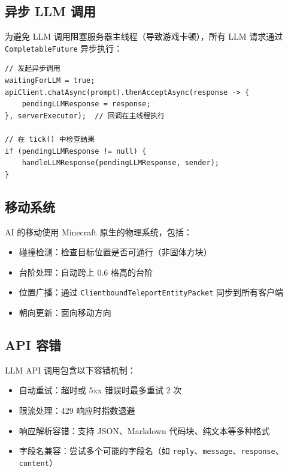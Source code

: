 \documentclass[12pt,a4paper]{article}
\begin{document}
\subsection{异步 LLM 调用}

为避免 LLM 调用阻塞服务器主线程（导致游戏卡顿），所有 LLM 请求通过 \texttt{CompletableFuture} 异步执行：

\begin{lstlisting}[caption={异步调用模式},label={lst:async}]
// 发起异步调用
waitingForLLM = true;
apiClient.chatAsync(prompt).thenAcceptAsync(response -> {
    pendingLLMResponse = response;
}, serverExecutor);  // 回调在主线程执行

// 在 tick() 中检查结果
if (pendingLLMResponse != null) {
    handleLLMResponse(pendingLLMResponse, sender);
}
\end{lstlisting}

\subsection{移动系统}

AI 的移动使用 Minecraft 原生的物理系统，包括：

\begin{itemize}
    \item 碰撞检测：检查目标位置是否可通行（非固体方块）
    \item 台阶处理：自动跨上 0.6 格高的台阶
    \item 位置广播：通过 \texttt{ClientboundTeleportEntityPacket} 同步到所有客户端
    \item 朝向更新：面向移动方向
\end{itemize}

\subsection{API 容错}

LLM API 调用包含以下容错机制：

\begin{itemize}
    \item 自动重试：超时或 5xx 错误时最多重试 2 次
    \item 限流处理：429 响应时指数退避
    \item 响应解析容错：支持 JSON、Markdown 代码块、纯文本等多种格式
    \item 字段名兼容：尝试多个可能的字段名（如 \texttt{reply}、\texttt{message}、\texttt{response}、\texttt{content}）
\end{itemize}
\end{document}
